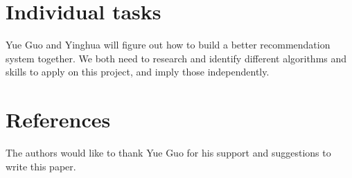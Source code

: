 \section{Individual tasks}
Yue Guo and Yinghua will figure out how to build a better recommendation system together. We both need to research and identify different algorithms and skills to apply on this project, and imply those independently. 

\section{References}



\begin{acks}

  The authors would like to thank Yue Guo for his
  support and suggestions to write this paper.

\end{acks}


 

